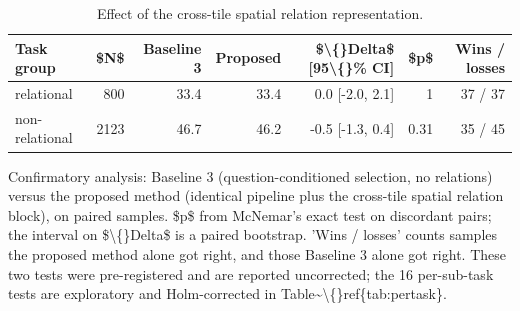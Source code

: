 \begin{table}[t]
\centering
\small
\begin{tabular}{lrrrrrr}
\toprule
Task group & \$N\$ & Baseline 3 & Proposed & \$\textbackslash\{\}Delta\$ [95\textbackslash\{\}\% CI] & \$p\$ & Wins / losses \\
\midrule
relational & 800 & 33.4 & 33.4 & 0.0 [-2.0, 2.1] & 1 & 37 / 37 \\
non-relational & 2123 & 46.7 & 46.2 & -0.5 [-1.3, 0.4] & 0.31 & 35 / 45 \\
\bottomrule
\end{tabular}
\vspace{2pt}
\begin{minipage}{\linewidth}\footnotesize Confirmatory analysis: Baseline 3 (question-conditioned selection, no relations) versus the proposed method (identical pipeline plus the cross-tile spatial relation block), on paired samples. \$p\$ from McNemar's exact test on discordant pairs; the interval on \$\textbackslash\{\}Delta\$ is a paired bootstrap. 'Wins / losses' counts samples the proposed method alone got right, and those Baseline 3 alone got right. These two tests were pre-registered and are reported uncorrected; the 16 per-sub-task tests are exploratory and Holm-corrected in Table\textasciitilde{}\textbackslash\{\}ref\{tab:pertask\}.\end{minipage}
\caption{Effect of the cross-tile spatial relation representation.}
\label{tab:significance}
\end{table}
